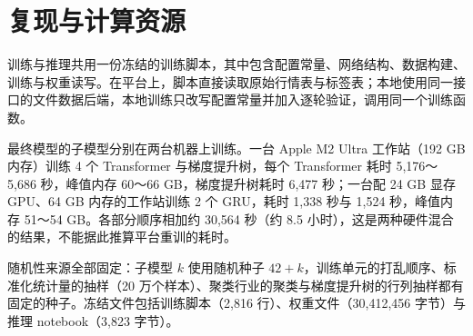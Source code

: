 \documentclass[UTF8,a4paper,zihao=-4,fontset=none]{ctexart}
\begin{document}
\section{复现与计算资源}\label{app:repro}

训练与推理共用一份冻结的训练脚本，其中包含配置常量、网络结构、数据构建、训练与权重读写。在平台上，脚本直接读取原始行情表与标签表；本地使用同一接口的文件数据后端，本地训练只改写配置常量并加入逐轮验证，调用同一个训练函数。

最终模型的子模型分别在两台机器上训练。一台 Apple M2 Ultra 工作站（192 GB 内存）训练 4 个 Transformer 与梯度提升树，每个 Transformer 耗时 5,176～5,686 秒，峰值内存 60～66 GB，梯度提升树耗时 6,477 秒；一台配 24 GB 显存 GPU、64 GB 内存的工作站训练 2 个 GRU，耗时 1,338 秒与 1,524 秒，峰值内存 51～54 GB。各部分顺序相加约 30,564 秒（约 8.5 小时），这是两种硬件混合的结果，不能据此推算平台重训的耗时。

随机性来源全部固定：子模型 $k$ 使用随机种子 $42+k$，训练单元的打乱顺序、标准化统计量的抽样（20 万个样本）、聚类行业的聚类与梯度提升树的行列抽样都有固定的种子。冻结文件包括训练脚本（2,816 行）、权重文件（30,412,456 字节）与推理 notebook（3,823 字节）。
\end{document}
